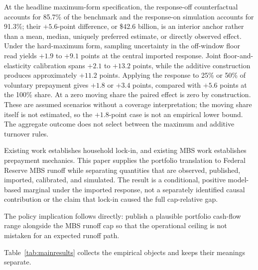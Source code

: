 At the headline maximum-form specification, the response-off counterfactual accounts for 85.7\% of the benchmark and the response-on simulation accounts for 91.3\%; their $+5.6$-point difference, or \$42.6 billion, is an interior anchor rather than a mean, median, uniquely preferred estimate, or directly observed effect. Under the hard-maximum form, sampling uncertainty in the off-window floor read yields $+1.9$ to $+9.1$ points at the central imported response. Joint floor-and-elasticity calibration spans $+2.1$ to $+13.2$ points, while the additive construction produces approximately $+11.2$ points. Applying the response to 25\% or 50\% of voluntary prepayment gives $+1.8$ or $+3.4$ points, compared with $+5.6$ points at the 100\% share. At a zero moving share the paired effect is zero by construction. These are assumed scenarios without a coverage interpretation; the moving share itself is not estimated, so the $+1.8$-point case is not an empirical lower bound. The aggregate outcome does not select between the maximum and additive turnover rules.

Existing work establishes household lock-in, and existing MBS work establishes prepayment mechanics. This paper supplies the portfolio translation to Federal Reserve MBS runoff while separating quantities that are observed, published, imported, calibrated, and simulated. The result is a conditional, positive model-based marginal under the imported response, not a separately identified causal contribution or the claim that lock-in caused the full cap-relative gap.

The policy implication follows directly: publish a plausible portfolio cash-flow range alongside the MBS runoff cap so that the operational ceiling is not mistaken for an expected runoff path.

Table~\ref{tab:mainresults} collects the empirical objects and keeps their meanings separate.

